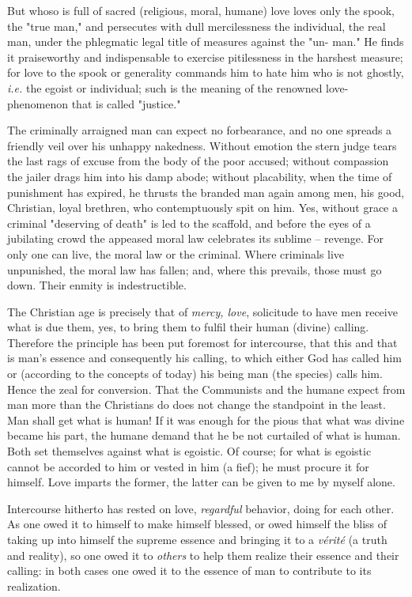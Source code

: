But whoso is full of sacred (religious, moral, humane) love loves only the 
spook, the "{}true man,"{} and persecutes with dull mercilessness the 
individual, the real man, under the phlegmatic legal title of measures against 
the "{}un- man."{} He finds it praiseworthy and indispensable to exercise 
pitilessness in the harshest measure; for love to the spook or generality 
commands him to hate him who is not ghostly, \textit{i.e.} the egoist or 
individual; such is the meaning of the renowned love-phenomenon that is called 
"{}justice."{}

The criminally arraigned man can expect no forbearance, and no one spreads a 
friendly veil over his unhappy nakedness. Without emotion the stern judge 
tears the last rags of excuse from the body of the poor accused; without 
compassion the jailer drags him into his damp abode; without placability, when 
the time of punishment has expired, he thrusts the branded man again among 
men, his good, Christian, loyal brethren, who contemptuously spit on him. Yes, 
without grace a criminal "{}deserving of death"{} is led to the scaffold, and 
before the eyes of a jubilating crowd the appeased moral law celebrates its 
sublime -- revenge. For only one can live, the moral law or the criminal. 
Where criminals live unpunished, the moral law has fallen; and, where this 
prevails, those must go down. Their enmity is indestructible.

The Christian age is precisely that of \textit{mercy, love}, solicitude to 
have men receive what is due them, yes, to bring them to fulfil their human 
(divine) calling. Therefore the principle has been put foremost for 
intercourse, that this and that is man's essence and consequently his calling, 
to which either God has called him or (according to the concepts of today) his 
being man (the species) calls him. Hence the zeal for conversion. That the 
Communists and the humane expect from man more than the Christians do does not 
change the standpoint in the least. Man shall get what is human! If it was 
enough for the pious that what was divine became his part, the humane demand 
that he be not curtailed of what is human. Both set themselves against what is 
egoistic. Of course; for what is egoistic cannot be accorded to him or vested 
in him (a fief); he must procure it for himself. Love imparts the former, the 
latter can be given to me by myself alone.

Intercourse hitherto has rested on love, \textit{regardful} behavior, doing 
for each other. As one owed it to himself to make himself blessed, or owed 
himself the bliss of taking up into himself the supreme essence and bringing 
it to a \textit{v\'erit\'e} (a truth and reality), so one owed it to 
\textit{others} to help them realize their essence and their calling: in both 
cases one owed it to the essence of man to contribute to its realization.

